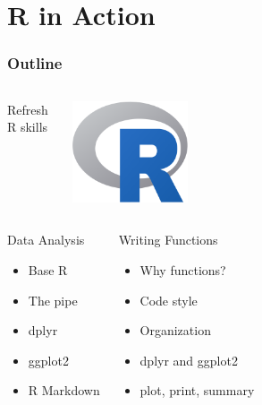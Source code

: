 \section{R in Action}

\begin{frame}
	\frametitle{Outline}
	
	\begin{columns}
		\begin{block}{Refresh R skills}
		\end{block}
		
		\includegraphics[width=0.3\textwidth]{../figs/Rlogo.png}
	\end{columns}

	\vfill
	
	\begin{columns}[onlytextwidth]
		\column{0.5\textwidth}
		\begin{block}{Data Analysis}
			\begin{itemize}
				\item Base R
				\item The pipe
				\item dplyr
				\item ggplot2
				\item R Markdown
			\end{itemize}
		\end{block}

		\column{0.5\textwidth}
		\begin{block}{Writing Functions}
			\begin{itemize}
				\item Why functions?
				\item Code style
				\item Organization
				\item dplyr and ggplot2
				\item plot, print, summary
			\end{itemize}
		\end{block}
	\end{columns}
\end{frame}

